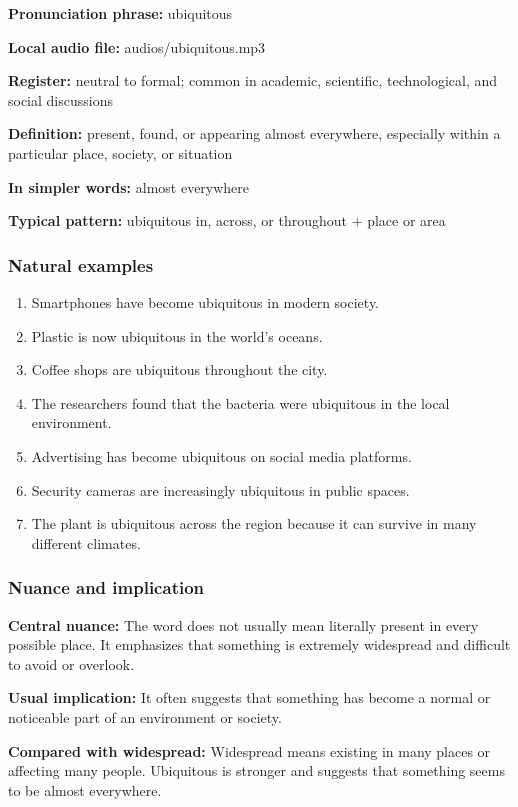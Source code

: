 \documentclass[11pt]{article}
\begin{document}
\textbf{Pronunciation phrase:} ubiquitous

\textbf{Local audio file:} audios/ubiquitous.mp3

\textbf{Register:} neutral to formal; common in academic, scientific, technological, and social discussions

\textbf{Definition:} present, found, or appearing almost everywhere, especially within a particular place, society, or situation

\textbf{In simpler words:} almost everywhere

\textbf{Typical pattern:} ubiquitous in, across, or throughout + place or area

\subsubsection{Natural examples}
\begin{enumerate}
  \item Smartphones have become ubiquitous in modern society.
  \item Plastic is now ubiquitous in the world's oceans.
  \item Coffee shops are ubiquitous throughout the city.
  \item The researchers found that the bacteria were ubiquitous in the local environment.
  \item Advertising has become ubiquitous on social media platforms.
  \item Security cameras are increasingly ubiquitous in public spaces.
  \item The plant is ubiquitous across the region because it can survive in many different climates.
\end{enumerate}

\subsubsection{Nuance and implication}
\textbf{Central nuance:} The word does not usually mean literally present in every possible place. It emphasizes that something is extremely widespread and difficult to avoid or overlook.

\textbf{Usual implication:} It often suggests that something has become a normal or noticeable part of an environment or society.

\textbf{Compared with widespread:} Widespread means existing in many places or affecting many people. Ubiquitous is stronger and suggests that something seems to be almost everywhere.
\end{document}
